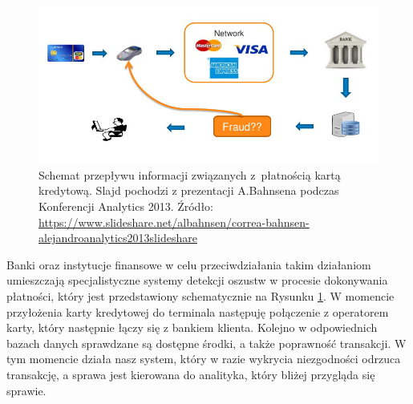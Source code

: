 \documentclass[inzynierska]{pwr_wmat_praca_dyplomowa}
\theoremstyle{plain}
\numberwithin{theorem}{chapter}
\theoremstyle{definition}
\numberwithin{theorem}{chapter}
\begin{document}
\begin{figure}[h]
	\includegraphics[width=\linewidth]{images/credit-card-flow.jpg}
	\caption{Schemat przepływu informacji związanych z~płatnością kartą kredytową. Slajd pochodzi z prezentacji A.Bahnsena podczas Konferencji Analytics 2013. Źródło: \url{https://www.slideshare.net/albahnsen/correa-bahnsen-alejandroanalytics2013slideshare}}
	\label{fig:credit-card-flow}
\end{figure}

Banki oraz instytucje finansowe w celu przeciwdziałania takim działaniom umieszczają specjalistyczne systemy detekcji oszustw w procesie dokonywania płatności, który jest przedstawiony schematycznie na Rysunku \ref{fig:credit-card-flow}. W momencie przyłożenia karty kredytowej do terminala następuję połączenie z operatorem karty, który następnie łączy się z bankiem klienta. Kolejno w odpowiednich bazach danych sprawdzane są dostępne środki, a także poprawność transakcji. W tym momencie działa nasz system, który w razie wykrycia niezgodności odrzuca transakcję, a sprawa jest kierowana do analityka, który bliżej przygląda się sprawie.
\end{document}
